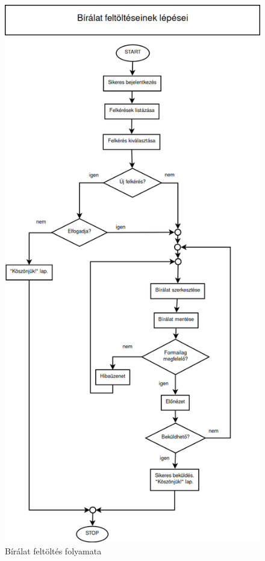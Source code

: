 \documentclass[a4paper,12pt]{article}
\begin{document}
\begin{figure}[h!]
\centering
\includegraphics[scale=0.45]{images/Folyamatabra/Biralat_Feltoltes.png}
\caption{Bírálat feltöltés folyamata}
\label{fig:Biralat_Feltoltes}
\end{figure}
\end{document}
